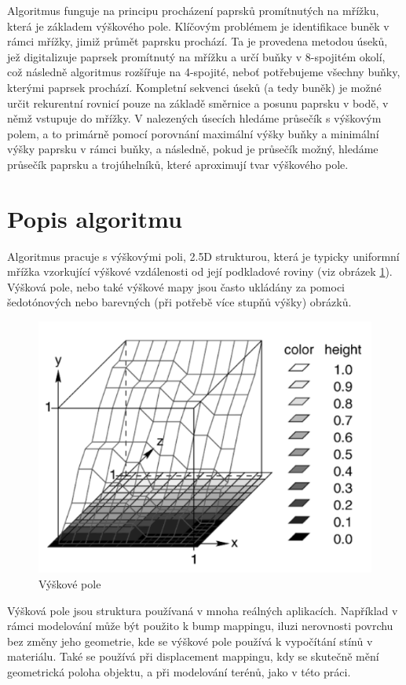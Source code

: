 \documentclass[report,11pt]{elsarticle}
\begin{document}
Algoritmus funguje na principu procházení paprsků promítnutých na mřížku, která je základem výškového pole. Klíčovým problémem je identifikace buněk v rámci mřížky, jimiž průmět paprsku prochází. Ta je provedena metodou úseků, jež digitalizuje paprsek promítnutý na mřížku a určí buňky v 8-spojitém okolí, což následně algoritmus rozšířuje na 4-spojité, neboť potřebujeme všechny buňky, kterými paprsek prochází. Kompletní sekvenci úseků (a tedy buněk) je možné určit rekurentní rovnicí pouze na základě směrnice a posunu paprsku v bodě, v němž vstupuje do mřížky. V nalezených úsecích hledáme průsečík s výškovým polem, a to primárně pomocí porovnání maximální výšky buňky a minimální výšky paprsku v rámci buňky, a následně, pokud je průsečík možný, hledáme průsečík paprsku a trojúhelníků, které aproximují tvar výškového pole.

\section{\label{SEC:Description}Popis algoritmu}
Algoritmus pracuje s výškovými poli, 2.5D strukturou, která je typicky uniformní mřížka vzorkující výškové vzdálenosti od její podkladové roviny (viz obrázek \ref{fig:heightfield}). Výšková pole, nebo také výškové mapy jsou často ukládány za pomoci šedotónových nebo barevných (při potřebě více stupňů výšky) obrázků.


\begin{figure}[h]
\hfill\includegraphics[width=0.6\linewidth]{Height field.png}\hspace*{\fill}
\caption{Výškové pole}
\label{fig:heightfield}
\end{figure}



Výšková pole jsou struktura používaná v mnoha reálných aplikacích. Například v rámci modelování může být použito k bump mappingu, iluzi nerovnosti povrchu bez změny jeho geometrie, kde se výškové pole používá k vypočítání stínů v materiálu. Také se používá při displacement mappingu, kdy se skutečně mění geometrická poloha objektu, a při modelování terénů, jako v této práci.
\end{document}
